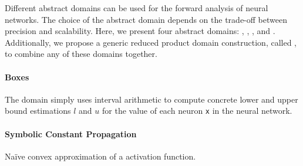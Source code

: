 Different abstract domains can be used for the forward analysis of neural networks.
The choice of the abstract domain depends on the trade-off between precision and scalability.
Here, we present four abstract domains: \boxes \cite{Cousot1976,Hickey2001}, \symbolic \cite{Li2019,Min_e2006b}, \deeppoly \cite{Singh19}, and \neurify \cite{Wang18}. Additionally, we propose a generic reduced product domain construction, called \reducedproduct, to combine any of these domains together.


\paragraph{Boxes}


The \boxes{} domain simply uses interval arithmetic  to compute concrete lower and upper bound estimations $l$ and $u$ for the value of each neuron \texttt{x} in the neural network.


\paragraph{Symbolic Constant Propagation}

\begin{marginfigure}
  \caption{Na\"ive convex approximation of a \relu{} activation function.}
\end{marginfigure}

